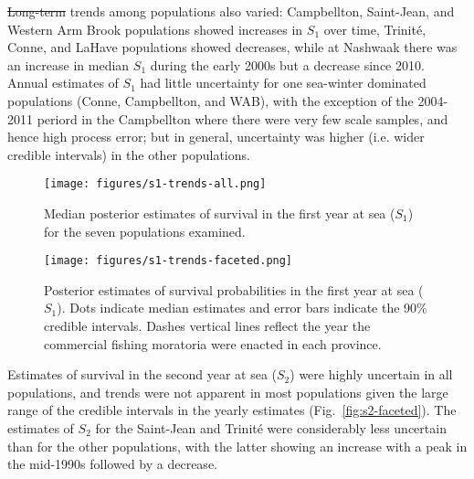 \documentclass[12pt]{article}
\newcommand{\So}{$S_{1}$\xspace}
\newcommand{\St}{$S_{2}$\xspace}
\providecommand{\DIFaddtex}[1]{{\protect\color{blue}\uwave{#1}}} %
\providecommand{\DIFdeltex}[1]{{\protect\color{red}\sout{#1}}}                      %
\providecommand{\DIFaddbegin}{} %
\providecommand{\DIFaddend}{} %
\providecommand{\DIFdelbegin}{} %
\providecommand{\DIFdelend}{} %
\providecommand{\DIFadd}[1]{\texorpdfstring{\DIFaddtex{#1}}{#1}} %
\providecommand{\DIFdel}[1]{\texorpdfstring{\DIFdeltex{#1}}{}} %
\begin{document}
\DIFdelbegin \DIFdel{Long-term }\DIFdelend \DIFaddbegin \DIFadd{Visual inspection of long-term }\DIFaddend trends among populations also varied: Campbellton,
Saint-Jean, and Western Arm Brook populations showed increases in \So
over time, Trinit\'{e}, Conne, and LaHave populations showed decreases,
while at Nashwaak there was an increase in median \So during the early
2000s but a decrease since 2010. Annual estimates of \So had little
uncertainty for one sea-winter dominated populations (Conne, Campbellton, and
WAB), with the exception of the 2004-2011 periord in the Campbellton where
there were very few scale samples, and hence high process error; but in general,
uncertainty was higher (i.e. wider credible intervals) in the other
populations.


\begin{figure}[htbp] \centering
    \texttt{[image: figures/s1-trends-all.png]}
    \caption{Median posterior estimates of survival in the first year at sea (\So)
        for the seven populations examined.} \label{fig:s1-dual}
\end{figure}
\begin{figure}[htbp] \centering
    \texttt{[image: figures/s1-trends-faceted.png]}
    \caption{Posterior estimates of survival probabilities in the first year at sea (\So). Dots indicate median estimates and error
        bars indicate the 90\% credible intervals. Dashes vertical lines reflect the year the commercial fishing moratoria were enacted
    in each province.} \label{fig:s1-faceted}
\end{figure}
Estimates of survival in the second year at sea (\St) were highly uncertain in all populations, and trends
were not apparent in most populations given the large range of the credible
intervals in the yearly estimates (Fig.~\ref{fig:s2-faceted}). The estimates
of \St for the Saint-Jean and Trinit\'{e} were considerably less uncertain
than for the other populations, with the latter showing an increase with a peak in the mid-1990s followed
by a decrease.
\end{document}
